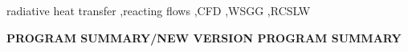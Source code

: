 \documentclass[preprint,12pt]{elsarticle}
\begin{document}
\begin{frontmatter}




\begin{keyword}
radiative heat transfer \sep reacting flows  \sep CFD \sep WSGG \sep RCSLW
\end{keyword}

\end{frontmatter}

\linenumbers


{\bf PROGRAM SUMMARY/NEW VERSION PROGRAM SUMMARY}
\end{document}
